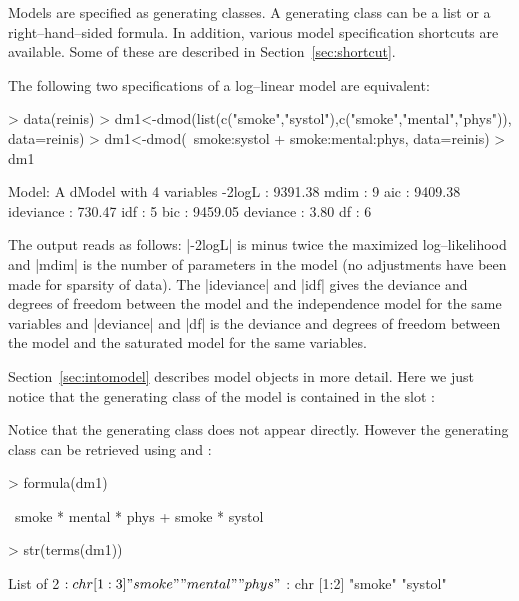 \documentclass[12pt]{article}
\begin{document}
Models are specified as generating classes. A generating class can be
a list or a right--hand--sided formula. In addition, various model
specification shortcuts are available.  Some of these are described in
Section~\ref{sec:shortcut}.

The following two
specifications of a log--linear model are equivalent:

\begin{Schunk}
\begin{Sinput}
> data(reinis)
> dm1<-dmod(list(c("smoke","systol"),c("smoke","mental","phys")), data=reinis)
> dm1<-dmod(~smoke:systol + smoke:mental:phys, data=reinis)
> dm1
\end{Sinput}
\begin{Soutput}
Model: A dModel with 4 variables
 -2logL    :        9391.38 mdim :    9 aic :      9409.38 
 ideviance :         730.47 idf  :    5 bic :      9459.05 
 deviance  :           3.80 df   :    6 
\end{Soutput}
\end{Schunk}

The output reads as follows: |-2logL| is minus twice the maximized
log--likelihood and |mdim| is the number of parameters in the model
(no adjustments have been made for sparsity of data).
The |ideviance| and |idf| gives the deviance and degrees of
freedom between the model and the independence model for the same
variables and |deviance| and |df| is the deviance and degrees of
freedom between the model and the saturated model for the same
variables.

Section~\ref{sec:intomodel} describes model objects in more
detail. Here we just notice that the generating class of the model is
contained in the slot :

Notice that the generating class does not appear directly. However the
generating class can be retrieved using  and :

\begin{Schunk}
\begin{Sinput}
> formula(dm1)
\end{Sinput}
\begin{Soutput}
~smoke * mental * phys + smoke * systol
\end{Soutput}
\begin{Sinput}
> str(terms(dm1))
\end{Sinput}
\begin{Soutput}
List of 2
 $ : chr [1:3] "smoke" "mental" "phys"
 $ : chr [1:2] "smoke" "systol"
\end{Soutput}
\end{Schunk}
\end{document}
